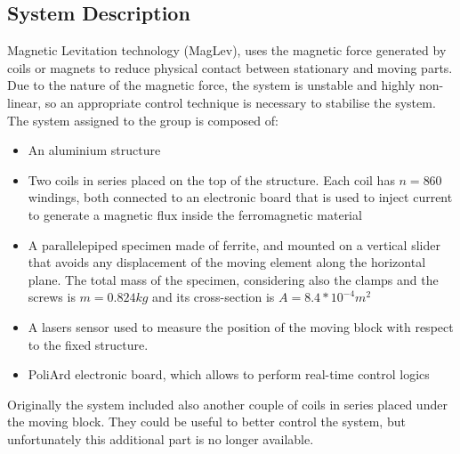 \documentclass[a4paper, 11pt] {article}
\begin{document}
\subsection{System Description}
Magnetic Levitation technology (MagLev), uses the magnetic force generated by coils or magnets to reduce physical contact between stationary and moving parts. Due to the nature of the magnetic force, the system is unstable and highly non-linear, so an appropriate control technique is necessary to stabilise the system. \\
The system assigned to the group is composed of: 
\begin{itemize}
\item An aluminium structure 
\item Two coils in series placed on the top of the structure. Each coil has $n = 860$ windings, both connected to an electronic board that is used to inject current to generate a magnetic flux inside the ferromagnetic material 
\item A parallelepiped specimen made of ferrite, and mounted on a vertical slider that avoids any displacement of the moving element along the horizontal plane. The total mass of the specimen, considering also the clamps and the screws is $m = 0.824 kg$ and its cross-section is $A = 8.4*10^{-4} m^{2}$
\item A lasers sensor used to measure the position of the moving block with respect to the fixed structure. 
\item     PoliArd electronic board, which allows to perform real-time control logics 
\end{itemize}

Originally the system included also another couple of coils in series placed under the moving block. They could be useful to better control the system, but unfortunately this additional part is no longer available.
\end{document}
